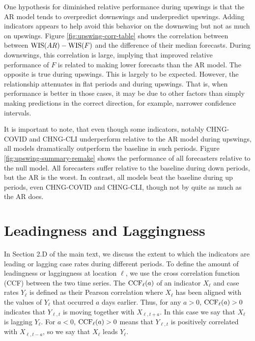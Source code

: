 One hypothesis for diminished relative performance during upswings is that the
AR model tends to overpredict downswings and underpredict upswings. Adding
indicators appears to help avoid this behavior on the downswing but not as much
on upswings. Figure \ref{fig:upswing-corr-table} shows the correlation between
between $\mathrm{WIS}(AR) - \mathrm{WIS}(F)$ and the difference of their median forecasts.
During downswings, this correlation is large, implying that improved relative
performance of $F$ is related to making lower forecasts than the AR model. The
opposite is true during upswings. This is largely to be expected. However, the
relationship attenuates in flat periods and during upswings. That is, when
performance is better in those cases, it may be due to other factors than simply
making predictions in the correct direction, for example, narrower confidence
intervals.

It is important to note, that even though some indicators, notably CHNG-COVID 
and CHNG-CLI underperform relative to the AR model during upswings, all models 
dramatically outperform the baseline in such periods. Figure 
\ref{fig:upswing-summary-remake} shows the performance of all forecasters relative
to the null model. All forecasters suffer relative to the baseline during down 
periods, but the AR is the worst. In contrast, all models beat the baseline
during up periods, even CHNG-COVID and CHNG-CLI, though not by quite as much as the
AR does.

\section{Leadingness and Laggingness}

In Section 2.D of the main text, we discuss the extent to which the indicators
are leading or lagging case rates during different periods. To define the amount
of leadingness or laggingness at location $\ell$, we use the cross correlation
function (CCF) between the two time series. The $\mathrm{CCF}_\ell(a)$ of an indicator
$X_{\ell}$ and case rates $Y_{\ell}$ is defined as
their Pearson correlation where $X_\ell$ has been aligned with the values of
$Y_{\ell}$ that occurred $a$ days earlier.  Thus, for any $a>0$,
$\mathrm{CCF}_{\ell}(a)>0$ indicates that $Y_{\ell,t}$ is moving together with
$X_{\ell,t+a}$.  In this case we say that $X_{\ell}$ is lagging $Y_{\ell}$. For
$a<0$, $\mathrm{CCF}_{\ell}(a)>0$ means that $Y_{\ell,t}$ is positively correlated with
$X_{\ell,t-a}$, so we say that $X_{\ell}$ leads $Y_{\ell}$.

